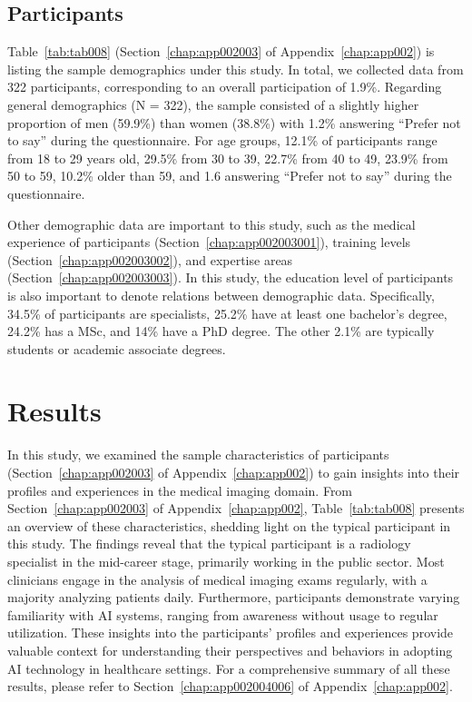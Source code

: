 \subsection{Participants}
\label{sec:chap004004002}

Table~\ref{tab:tab008} (Section~\ref{chap:app002003} of Appendix~\ref{chap:app002}) is listing the sample demographics under this study.
In total, we collected data from 322 participants, corresponding to an overall participation of 1.9\%.
Regarding general demographics (N = 322), the sample consisted of a slightly higher proportion of men (59.9\%) than women (38.8\%) with 1.2\% answering ``Prefer not to say'' during the questionnaire.
For age groups, 12.1\% of participants range from 18 to 29 years old, 29.5\% from 30 to 39, 22.7\% from 40 to 49, 23.9\% from 50 to 59, 10.2\% older than 59, and 1.6 answering ``Prefer not to say'' during the questionnaire.

Other demographic data are important to this study, such as the medical experience of participants (Section~\ref{chap:app002003001}), training levels (Section~\ref{chap:app002003002}), and expertise areas (Section~\ref{chap:app002003003}).
In this study, the education level of participants is also important to denote relations between demographic data.
Specifically, 34.5\% of participants are specialists, 25.2\% have at least one bachelor's degree, 24.2\% has a \ac{MSc}, and 14\% have a \ac{PhD} degree.
The other 2.1\% are typically students or academic associate degrees.

\section{Results}
\label{sec:chap004005}

In this study, we examined the sample characteristics of participants (Section~\ref{chap:app002003} of Appendix~\ref{chap:app002}) to gain insights into their profiles and experiences in the medical imaging domain.
From Section~\ref{chap:app002003} of Appendix~\ref{chap:app002}, Table~\ref{tab:tab008} presents an overview of these characteristics, shedding light on the typical participant in this study.
The findings reveal that the typical participant is a radiology specialist in the mid-career stage, primarily working in the public sector.
Most clinicians engage in the analysis of medical imaging exams regularly, with a majority analyzing patients daily.
Furthermore, participants demonstrate varying familiarity with \ac{AI} systems, ranging from awareness without usage to regular utilization.
These insights into the participants' profiles and experiences provide valuable context for understanding their perspectives and behaviors in adopting \ac{AI} technology in healthcare settings.
For a comprehensive summary of all these results, please refer to Section~\ref{chap:app002004006} of Appendix~\ref{chap:app002}.

